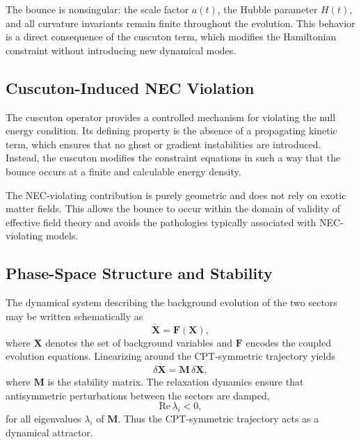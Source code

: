\documentclass[11pt,a4paper]{article}
\begin{document}
The bounce is nonsingular: the scale factor \(a(t)\), the Hubble parameter
\(H(t)\), and all curvature invariants remain finite throughout the evolution.
This behavior is a direct consequence of the cuscuton term, which modifies the
Hamiltonian constraint without introducing new dynamical modes.

\subsection{Cuscuton-Induced NEC Violation}

The cuscuton operator provides a controlled mechanism for violating the null
energy condition. Its defining property is the absence of a propagating kinetic
term, which ensures that no ghost or gradient instabilities are introduced.
Instead, the cuscuton modifies the constraint equations in such a way that the
bounce occurs at a finite and calculable energy density.

The NEC-violating contribution is purely geometric and does not rely on exotic
matter fields. This allows the bounce to occur within the domain of validity of
effective field theory and avoids the pathologies typically associated with
NEC-violating models.

\subsection{Phase-Space Structure and Stability}

The dynamical system describing the background evolution of the two sectors may
be written schematically as
\begin{equation}
    \dot{\mathbf{X}} = \mathbf{F}(\mathbf{X}),
\end{equation}
where \(\mathbf{X}\) denotes the set of background variables and
\(\mathbf{F}\) encodes the coupled evolution equations. Linearizing around the
CPT-symmetric trajectory yields
\begin{equation}
    \delta\dot{\mathbf{X}}
        = \mathbf{M}\,\delta\mathbf{X},
\end{equation}
where \(\mathbf{M}\) is the stability matrix. The relaxation dynamics ensure that
antisymmetric perturbations between the sectors are damped,
\begin{equation}
    \mathrm{Re}\,\lambda_{i} < 0,
\end{equation}
for all eigenvalues \(\lambda_{i}\) of \(\mathbf{M}\). Thus the CPT-symmetric
trajectory acts as a dynamical attractor.
\end{document}
